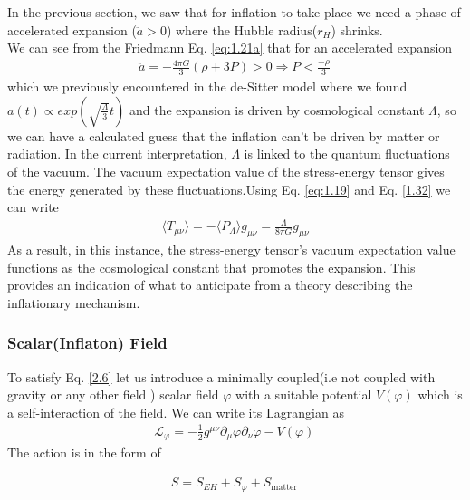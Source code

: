 \hspace{0.5cm}In the previous section, we saw that for inflation to take place we need a phase of accelerated expansion ($\ddot{a} > 0$) where the Hubble radius($r_{H}$) shrinks.\\
We can see from the Friedmann Eq. \ref{eq:1.21a} that for an accelerated expansion
\begin{align}
    \ddot{a} = -\frac{4 \pi G}{3}(\rho+3P) > 0 \Rightarrow P < \frac{-\rho}{3}\,\label{2.6}
\end{align}
which we previously encountered in the de-Sitter model where we found $a(t) \propto exp(\sqrt{\frac{\Lambda}{3}}t)$ and the expansion is driven by cosmological constant $\Lambda$, so we can have a calculated guess that the inflation can't be driven by matter or radiation. In the current interpretation, $\Lambda$ is linked to the quantum fluctuations of the vacuum. The vacuum expectation value of the stress-energy tensor gives the energy generated by these fluctuations.Using Eq. \ref{eq:1.19} and Eq. \ref{1.32} we can write
\\
\begin{align}
    \langle T_{\mu\nu} \rangle = -\langle P_{\Lambda} \rangle g_{\mu\nu} = \frac{\Lambda}{8\pi G} g_{\mu\nu} \label{2.7}
\end{align}
As a result, in this instance, the stress-energy tensor's vacuum expectation value functions as the cosmological constant that promotes the expansion. This provides an indication of what to anticipate from a theory describing the inflationary mechanism.

\subsubsection{Scalar(Inflaton) Field }





\hspace{0.5cm}To satisfy Eq. \ref{2.6} let us introduce a minimally coupled(i.e not coupled with gravity or any other field ) scalar field \(\varphi\)  with a suitable potential $V(\varphi)$ which is a self-interaction of the field. We can write its Lagrangian as 
\begin{align}
    \mathscr{L}_{\varphi} = -\frac{1}{2} g^{\mu\nu} \partial_{\mu}\varphi\partial_{\nu}\varphi - V(\varphi)\, \label{2.8}
\end{align}
The action is in the form of 

\begin{align}
    S = S_{EH} + S_\varphi + S _{\text{matter}}\,\label{2.9}
\end{align}

